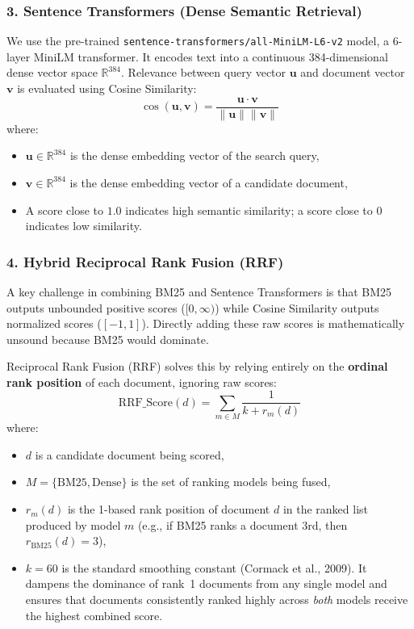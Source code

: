 \documentclass[11pt,a4paper]{article}
\begin{document}
\subsubsection{3. Sentence Transformers (Dense Semantic Retrieval)}
We use the pre-trained \texttt{sentence-transformers/all-MiniLM-L6-v2} model, a 6-layer MiniLM transformer. It encodes text into a continuous 384-dimensional dense vector space $\mathbb{R}^{384}$. Relevance between query vector $\mathbf{u}$ and document vector $\mathbf{v}$ is evaluated using Cosine Similarity:
\begin{equation}
\cos(\mathbf{u}, \mathbf{v}) = \frac{\mathbf{u} \cdot \mathbf{v}}{\|\mathbf{u}\| \|\mathbf{v}\|}
\end{equation}
where:
\begin{itemize}[leftmargin=1.5em, topsep=2pt]
    \item $\mathbf{u} \in \mathbb{R}^{384}$ is the dense embedding vector of the search query,
    \item $\mathbf{v} \in \mathbb{R}^{384}$ is the dense embedding vector of a candidate document,
    \item A score close to $1.0$ indicates high semantic similarity; a score close to $0$ indicates low similarity.
\end{itemize}

\subsubsection{4. Hybrid Reciprocal Rank Fusion (RRF)}
A key challenge in combining BM25 and Sentence Transformers is that BM25 outputs unbounded positive scores ($[0, \infty)$) while Cosine Similarity outputs normalized scores ($[-1, 1]$). Directly adding these raw scores is mathematically unsound because BM25 would dominate.

Reciprocal Rank Fusion (RRF) solves this by relying entirely on the \textbf{ordinal rank position} of each document, ignoring raw scores:
\begin{equation}
\text{RRF\_Score}(d) = \sum_{m \in M} \frac{1}{k + r_m(d)}
\end{equation}
where:
\begin{itemize}[leftmargin=1.5em, topsep=2pt]
    \item $d$ is a candidate document being scored,
    \item $M = \{\text{BM25}, \text{Dense}\}$ is the set of ranking models being fused,
    \item $r_m(d)$ is the 1-based rank position of document $d$ in the ranked list produced by model $m$ (e.g., if BM25 ranks a document 3rd, then $r_{\text{BM25}}(d) = 3$),
    \item $k = 60$ is the standard smoothing constant (Cormack et al., 2009). It dampens the dominance of rank~1 documents from any single model and ensures that documents consistently ranked highly across \textit{both} models receive the highest combined score.
\end{itemize}
\end{document}
